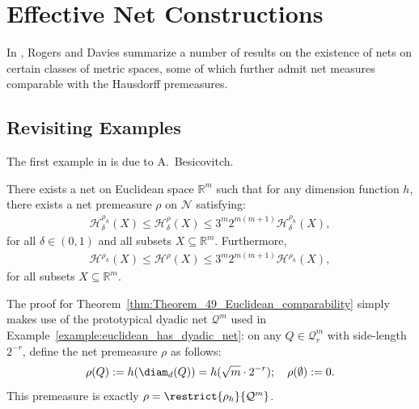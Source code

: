 
\section{Effective Net Constructions}
\label{section:Effective_Constructions_on_Net_Spaces}

In \cite{Rog70}, Rogers and Davies summarize a number of results on the existence of nets on certain classes of metric spaces, some of which further admit net measures comparable with the Hausdorff premeasures.

\subsection{Revisiting Examples}

The first example in \cite{Rog70} is due to A.~Besicovitch. 

\begin{theorem}
    \label{thm:Theorem_49_Euclidean_comparability}
    There exists a net on Euclidean space $\mathbb{R}^m$ such that for any dimension function $h$, there exists a net premeasure $\rho$ on $\mathcal{N}$ satisfying:
    \begin{align*}
        \mathcal{H}^{\rho_h}_\delta(X) \leq \mathcal{H}^\rho_\delta(X) \leq 3^m 2^{m(m + 1)} \mathcal{H}^{\rho_h}_\delta(X),
    \end{align*}
    for all $\delta \in (0, 1)$ and all subsets $X \subseteq \mathbb{R}^m$. Furthermore, 
    \begin{align*}
        \mathcal{H}^{\rho_h}(X) \leq \mathcal{H}^\rho(X) \leq 3^m 2^{m(m + 1)} \mathcal{H}^{\rho_h}(X),
    \end{align*}
    for all subsets $X \subseteq \mathbb{R}^m$.
\end{theorem}

The proof for Theorem~\ref{thm:Theorem_49_Euclidean_comparability} simply makes use of the prototypical dyadic net $\mathcal{Q}^m$ used in Example~\ref{example:euclidean_has_dyadic_net}: on any $Q \in \mathcal{Q}^m_r$ with side-length $2^{-r}$, define the net premeasure $\rho$ as follows:
\begin{align*}
    \rho(Q) := h(\diam_d(Q)) = h(\sqrt{m} \cdot 2^{-r}); \quad \rho(\emptyset) := 0.
\end{align*}
This premeasure is exactly $\rho = \restrict{\rho_h}{\mathcal{Q}^m}$. 

